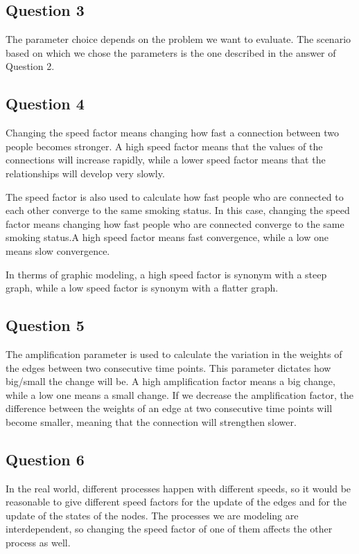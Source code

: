 \documentclass[a4paper]{article}
\begin{document}
\subsection{Question 3}

The parameter choice depends on the problem we want to evaluate. The scenario based on which we chose the parameters is the one described in the answer of Question 2. 

\subsection{Question 4}
 
Changing the speed factor means changing how fast a connection between two people becomes stronger. A high speed factor means that the values of the connections will increase rapidly, while a lower speed factor means that the relationships will develop very slowly. 

The speed factor is also used to calculate how fast people who are connected to each other converge to the same smoking status. In this case, changing the speed factor means changing how fast people who are connected converge to the same smoking status.A high speed factor means fast convergence, while a low one means slow convergence. 

In therms of graphic modeling, a high speed factor is synonym with a steep graph, while a low speed factor is synonym with a flatter graph. 

\subsection{Question 5}

The amplification parameter is used to calculate the variation in the weights of the edges between two consecutive time points. This parameter dictates how big/small the change will be. A high amplification factor means a big change, while a low one means a small change. If we decrease the amplification factor, the difference between the weights of an edge at two consecutive time points will become smaller, meaning that the connection will strengthen slower. 

\subsection{Question 6}

In the real world, different processes happen with different speeds, so it would be reasonable to give different speed factors for the update of the edges and for the update of the states of the nodes. 
The processes we are modeling are interdependent, so changing the speed factor of one of them affects the other process as well. 
\end{document}
